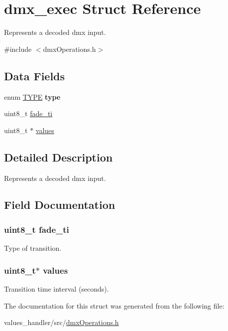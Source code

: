 \hypertarget{structdmx__exec}{}\section{dmx\+\_\+exec Struct Reference}
\label{structdmx__exec}


Represents a decoded dmx input.  




{\ttfamily \#include $<$dmx\+Operations.\+h$>$}

\subsection*{Data Fields}
\begin{DoxyCompactItemize}
\item 
\hypertarget{structdmx__exec_a61153eb2f0c62526b8163ab77b3d1101}{}enum \hyperlink{dmx_operations_8h_a0bc6723d5d4776ab7cdc646728b775f7}{T\+Y\+P\+E} {\bfseries type}\label{structdmx__exec_a61153eb2f0c62526b8163ab77b3d1101}

\item 
uint8\+\_\+t \hyperlink{structdmx__exec_a25cb98ef5b9b12b3fc779555a9ee0d1a}{fade\+\_\+ti}
\item 
uint8\+\_\+t $\ast$ \hyperlink{structdmx__exec_a4c4196b5d7b92a93df1f574659fd2ed1}{values}
\end{DoxyCompactItemize}


\subsection{Detailed Description}
Represents a decoded dmx input. 

\subsection{Field Documentation}
\hypertarget{structdmx__exec_a25cb98ef5b9b12b3fc779555a9ee0d1a}{}
\subsubsection[{fade\+\_\+ti}]{\setlength{\rightskip}{0pt plus 5cm}uint8\+\_\+t fade\+\_\+ti}\label{structdmx__exec_a25cb98ef5b9b12b3fc779555a9ee0d1a}
Type of transition. \hypertarget{structdmx__exec_a4c4196b5d7b92a93df1f574659fd2ed1}{}
\subsubsection[{values}]{\setlength{\rightskip}{0pt plus 5cm}uint8\+\_\+t$\ast$ values}\label{structdmx__exec_a4c4196b5d7b92a93df1f574659fd2ed1}
Transition time interval (seconds). 

The documentation for this struct was generated from the following file\+:\begin{DoxyCompactItemize}
\item 
values\+\_\+handler/src/\hyperlink{dmx_operations_8h}{dmx\+Operations.\+h}\end{DoxyCompactItemize}
